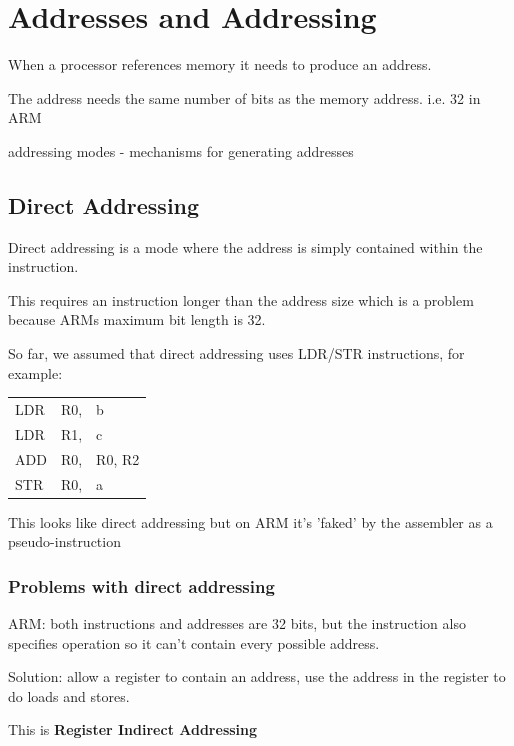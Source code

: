 
\section{Addresses and Addressing}
When a processor references memory it needs to produce an address.

The address needs the same number of bits as the memory address. i.e. 32 in ARM

addressing modes - mechanisms for generating addresses

\subsection{Direct Addressing}

Direct addressing is a mode where the address is simply contained within the
instruction.

This requires an instruction longer than the address size which is a problem
because ARMs maximum bit length is 32.

So far, we assumed that direct addressing uses LDR/STR instructions, for
example:

\begin{center}
    \begin{tabular}{l l l}
        LDR & R0, & b\\
        LDR & R1, & c\\
        ADD & R0, & R0, R2\\
        STR & R0, & a \\
    \end{tabular}
\end{center}

This looks like direct addressing but on ARM it's 'faked' by the assembler as a
pseudo-instruction

\subsubsection{Problems with direct addressing}

ARM: both instructions and addresses are 32 bits, but the instruction also
specifies operation so it can't contain every possible address.

Solution: allow a register to contain an address, use the address in the
register to do loads and stores.

This is {\bf Register Indirect Addressing}

